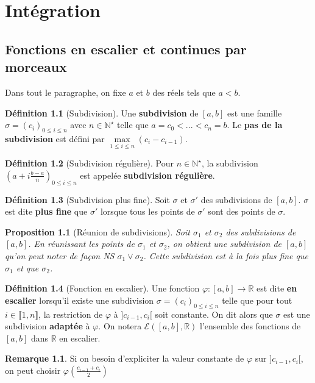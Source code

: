 \documentclass[french]{book}
\newcommand{\N}{\mathbb{N}}
\newcommand{\R}{\mathbb{R}}
\newcommand{\st}{^\star}
\theoremstyle{plain}
\newtheorem{prop}{Proposition}[chapter]
\theoremstyle{definition}
\newtheorem{dfn}{Définition}[chapter]
\newtheorem{rmq}{Remarque}[chapter]
\theoremstyle{remark}
\begin{document}
\newpage
\chapter{Intégration}
\section{Fonctions en escalier et continues par morceaux}
Dans tout le paragraphe, on fixe $a$ et $b$ des réels tels que $a<b$.
\begin{dfn}[Subdivision]
	Une \textbf{subdivision} de $[a,b]$ est une famille $\sigma=(c_i)_{0\leqslant i\leqslant n}$ avec $n\in\N\st$ telle que $a=c_0<...<c_n=b$. Le \textbf{pas de la subdivision} est défini par $\underset{1\leqslant i\leqslant n}{\max}(c_i-c_{i-1})$.
\end{dfn}
\begin{dfn}[Subdivision régulière]
	Pour $n\in\N\st$, la subdivision $\displaystyle \left(a+i\frac{b-a}{n}\right)_{0\leqslant i\leqslant n}$ est appelée \textbf{subdivision régulière}.
\end{dfn}
\begin{dfn}[Subdivision plus fine]
	Soit $\sigma$ et $\sigma'$ des subdivisions de $[a,b]$. $\sigma$ est dite \textbf{plus fine} que $\sigma'$ lorsque tous les points de $\sigma'$ sont des points de $\sigma$.
\end{dfn}
\begin{prop}[Réunion de subdivisions]
	Soit $\sigma_1$ et $\sigma_2$ des subdivisions de $[a,b]$. En réunissant les points de $\sigma_1$ et $\sigma_2$, on obtient une subdivision de $[a,b]$ qu'on peut noter de façon NS $\sigma_1 \vee \sigma_2$. Cette subdivision est à la fois plus fine que $\sigma_1$ et que $\sigma_2$.
\end{prop}
\begin{dfn}[Fonction en escalier]
	Une fonction $\varphi:[a,b]\rightarrow\R$ est dite \textbf{en escalier} lorsqu'il existe une subdivision $\sigma=(c_i)_{0\leqslant i\leqslant n}$ telle que pour tout $i\in\llbracket1,n\rrbracket$, la restriction de $\varphi$ à $]c_{i-1},c_i[$ soit constante. On dit alors que $\sigma$ est une subdivision \textbf{adaptée} à $\varphi$. On notera $\mathcal{E}([a,b],\R)$ l'ensemble des fonctions de $[a,b]$ dans $\R$ en escalier.
\end{dfn}
\begin{rmq} Si on besoin d'expliciter la valeur constante de $\varphi$ sur $]c_{i-1},c_i[$, on peut choisir $\displaystyle \varphi \left(\frac{c_{i-1}+c_i}{2}\right)$ \end{rmq}
\end{document}

